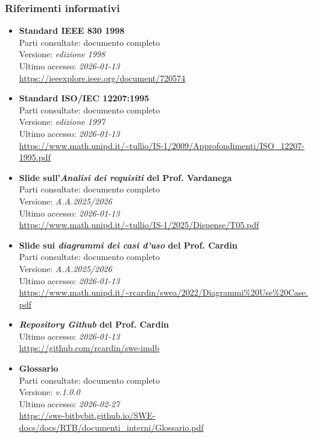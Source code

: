 \documentclass[a4paper,12pt]{article}
\begin{document}
\subsubsection{Riferimenti informativi} \label{sec:riferimenti_informativi}
\begin{itemize}
    \item \textbf{Standard IEEE 830 1998}\\
        Parti consultate: documento completo\\
        Versione: \textit{edizione 1998}\\
        Ultimo accesso: \textit{2026-01-13}\\
        \url{https://ieeexplore.ieee.org/document/720574}
    \item \textbf{Standard ISO/IEC 12207:1995}\\
        Parti consultate: documento completo\\
        Versione: \textit{edizione 1997} \\
        Ultimo accesso: \textit{2026-01-13}\\
        \url{https://www.math.unipd.it/~tullio/IS-1/2009/Approfondimenti/ISO_12207-1995.pdf}
    \item \textbf{Slide sull'\emph{Analisi dei requisiti} del Prof. Vardanega}\\
        Parti consultate: documento completo\\
        Versione: \textit{A.A.2025/2026}\\
        Ultimo accesso: \textit{2026-01-13}\\
        \url{https://www.math.unipd.it/~tullio/IS-1/2025/Dispense/T05.pdf}
    \item \textbf{Slide sui \emph{diagrammi dei casi d'uso} del Prof. Cardin}\\
        Parti consultate: documento completo\\
        Versione: \textit{A.A.2025/2026}\\
        Ultimo accesso: \textit{2026-01-13}\\
        \url{https://www.math.unipd.it/~rcardin/swea/2022/Diagrammi%20Use%20Case.pdf}
    \item \textbf{\emph{Repository Github} del Prof. Cardin}\\
        Ultimo accesso: \textit{2026-01-13}\\
        \url{https://github.com/rcardin/swe-imdb}
    \item \textbf{Glossario}\\
        Parti consultate: documento completo\\
        Versione: \textit{v.1.0.0}\\
        Ultimo accesso: \textit{2026-02-27}\\
        \url{https://swe-bitbybit.github.io/SWE-docs/docs/RTB/documenti_interni/Glossario.pdf}
\end{itemize}
\end{document}
